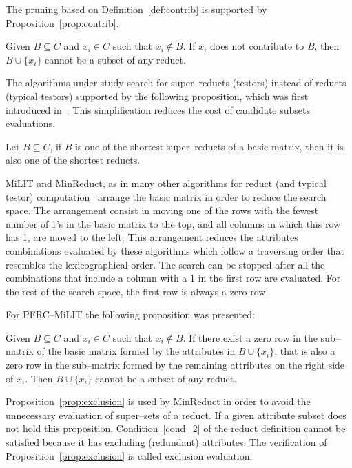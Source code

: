 \documentclass[citenumber]{llncs}
\begin{document}
	The pruning based on Definition~\ref{def:contrib} is supported by Proposition~\ref{prop:contrib}.
	
	\begin{proposition}\label{prop:contrib} 
		Given $B \subseteq C$ and  $x_i \in C$ such that $x_i \notin B$. If $x_i$ does not contribute to $B$, then $B\cup\{x_i\}$ cannot be a subset of any reduct.
	\end{proposition}
	
	The algorithms under study search for super--reducts (testors) instead of reducts (typical testors) supported by the following proposition, which was first introduced in~\cite{Zhou2009}. This simplification reduces the cost of candidate subsets evaluations.
	
	\begin{proposition}\label{prop:sr} 
		Let $B \subseteq C$, if $B$ is one of the shortest super--reducts of a basic matrix, then it is also one of the shortest reducts.
	\end{proposition}	

	MiLIT and MinReduct, as in many other algorithms for reduct (and typical testor) computation~\cite{Sanchez07,Lias13,Rodriguez2018} arrange the basic matrix in order to reduce the search space. The arrangement consist in moving one of the rows with the fewest number of 1's in the basic matrix to the top, and all columns in which this row has 1, are moved to the left. This arrangement reduces the attributes combinations evaluated by these algorithms which follow a traversing order that resembles the lexicographical order. The search can be stopped after all the combinations that include a column with a 1 in the first row are evaluated. For the rest of the search space, the first row is always a zero row.
	
	For PFRC--MiLIT the following proposition was presented:
	
	\begin{proposition}\label{prop:zrPrevail} 
		Given $B \subseteq C$ and  $x_i \in C$ such that $x_i \notin B$. If there exist a zero row in the sub--matrix of the basic matrix formed by the attributes in $B\cup\{x_i\}$, that is also a zero row in the sub--matrix formed by the remaining attributes on the right side of $x_i$. Then $B\cup\{x_i\}$ cannot be a subset of any reduct.
	\end{proposition}

	Proposition~\ref{prop:exclusion} is used by MinReduct in order to avoid the unnecessary evaluation of super--sets of a reduct. If a given attribute subset does not hold this proposition, Condition~\ref{cond_2} of the reduct definition cannot be satisfied because it has excluding (redundant) attributes. The verification of Proposition~\ref{prop:exclusion} is called exclusion evaluation.
	
\end{document}
